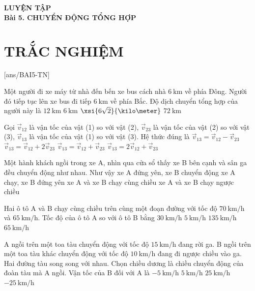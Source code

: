 \begin{center}\textbf{\color{red}LUYỆN TẬP}\\
	\textbf{Bài 5. CHUYỂN ĐỘNG TỔNG HỢP}
\end{center}
\section{TRẮC NGHIỆM}
[ans/BAI5-TN]
\begin{ex}
Một người đi xe máy từ nhà đến bến xe bus cách nhà $\SI{6}{\kilo\meter}$ về phía Đông. Người đó tiếp tục lên xe bus đi tiếp $\SI{6}{\kilo\meter}$ về phía Bắc. Độ dịch chuyển tổng hợp của người này là	
	\choice
	{$\SI{12}{\kilo\meter}$}
	{$\SI{6}{\kilo\meter}$}
	{\True $\xsi{6\sqrt{2}}{\kilo\meter}$}
	{$\SI{72}{\kilo\meter}$}
	\loigiai{}
\end{ex}
\begin{ex}
	Gọi $\vec{v}_{12}$ là vận tốc của vật (1) so với vật (2), $\vec{v}_{23}$ là vận tốc của vật (2) so với vật (3), $\vec{v}_{13}$ là vận tốc của vật (1) so với vật (3). Hệ thức đúng là
	\choice
	{$\vec{v}_{13}=\vec{v}_{12}-\vec{v}_{23}$}
	{$\vec{v}_{13}=\vec{v}_{12}+2\vec{v}_{23}$}
	{\True $\vec{v}_{13}=\vec{v}_{12}+\vec{v}_{23}$}
	{$\vec{v}_{13}=2\vec{v}_{12}+\vec{v}_{23}$}
	\loigiai{}
\end{ex}
\begin{ex}
	Một hành khách ngồi trong xe A, nhìn qua cửa sổ thấy xe B bên cạnh và sân ga đều chuyển động như nhau. Như vậy
	\choice
	{xe A đứng yên, xe B chuyển động}
	{\True xe A chạy, xe B đứng yên}
	{xe A và xe B chạy cùng chiều}
	{xe A và xe B chạy ngược chiều}
	\loigiai{}
\end{ex}
\begin{ex}
Hai ô tô A và B chạy cùng chiều trên cùng một đoạn đường với tốc độ $\SI{70}{\kilo\meter/\hour}$ và $\SI{65}{\kilo\meter/\hour}$. Tốc độ của ô tô A so với ô tô B bằng	
	\choice
	{$\SI{30}{\kilo\meter/\hour}$}
	{\True $\SI{5}{\kilo\meter/\hour}$}
	{$\SI{135}{\kilo\meter/\hour}$}
	{$\SI{65}{\kilo\meter/\hour}$}
	\loigiai{}
\end{ex}
\begin{ex}
	A ngồi trên một toa tàu chuyển động với tốc độ $\SI{15}{\kilo\meter/\hour}$ đang rời ga. B ngồi trên một toa tàu khác chuyển động với tốc độ $\SI{10}{\kilo\meter/\hour}$ đang đi ngược chiều vào ga. Hai đường tàu song song với nhau. Chọn chiều dương là chiều chuyển động của đoàn tàu mà A ngồi. Vận tốc của B đối với A là
	\choice
	{$\SI{-5}{\kilo\meter/\hour}$}
	{$\SI{5}{\kilo\meter/\hour}$}
	{$\SI{25}{\kilo\meter/\hour}$}
	{\True $\SI{-25}{\kilo\meter/\hour}$}
	\loigiai{}
\end{ex}
